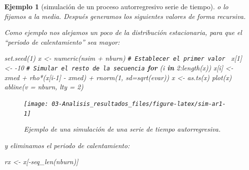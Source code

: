 \documentclass[
]{book}
\newenvironment{Shaded}{\begin{snugshade}}{\end{snugshade}}
\newcommand{\AttributeTok}[1]{\textcolor[rgb]{0.77,0.63,0.00}{#1}}
\newcommand{\CommentTok}[1]{\textcolor[rgb]{0.56,0.35,0.01}{\textit{#1}}}
\newcommand{\ControlFlowTok}[1]{\textcolor[rgb]{0.13,0.29,0.53}{\textbf{#1}}}
\newcommand{\DecValTok}[1]{\textcolor[rgb]{0.00,0.00,0.81}{#1}}
\newcommand{\FunctionTok}[1]{\textcolor[rgb]{0.00,0.00,0.00}{#1}}
\newcommand{\NormalTok}[1]{#1}
\newcommand{\OtherTok}[1]{\textcolor[rgb]{0.56,0.35,0.01}{#1}}
\newcommand{\SpecialCharTok}[1]{\textcolor[rgb]{0.00,0.00,0.00}{#1}}
\theoremstyle{break}
\newtheorem{example}{Ejemplo}[chapter]
\theoremstyle{nonumberplain}
\renewcommand{\CommentTok}[1]{\textcolor[rgb]{0.41,0.41,0.41}{\texttt{#1}}}
\begin{document}
\begin{example}[simulación de un proceso autorregresivo serie de tiempo]
o lo fijamos a la media.
Después generamos los siguientes valores de forma recursiva.

Como ejemplo nos alejamos un poco de la distribución estacionaria, para que el ``periodo de calentamiento'' sea mayor:

\begin{Shaded}
\begin{Highlighting}[]
\FunctionTok{set.seed}\NormalTok{(}\DecValTok{1}\NormalTok{)}
\NormalTok{x }\OtherTok{\textless{}{-}} \FunctionTok{numeric}\NormalTok{(nsim }\SpecialCharTok{+}\NormalTok{ nburn)}
\CommentTok{\# Establecer el primer valor }
\NormalTok{x[}\DecValTok{1}\NormalTok{] }\OtherTok{\textless{}{-}} \SpecialCharTok{{-}}\DecValTok{10}
\CommentTok{\# Simular el resto de la secuencia}
\ControlFlowTok{for}\NormalTok{ (i }\ControlFlowTok{in} \DecValTok{2}\SpecialCharTok{:}\FunctionTok{length}\NormalTok{(x))}
\NormalTok{  x[i] }\OtherTok{\textless{}{-}}\NormalTok{ xmed }\SpecialCharTok{+}\NormalTok{ rho}\SpecialCharTok{*}\NormalTok{(x[i}\DecValTok{{-}1}\NormalTok{] }\SpecialCharTok{{-}}\NormalTok{ xmed) }\SpecialCharTok{+} \FunctionTok{rnorm}\NormalTok{(}\DecValTok{1}\NormalTok{, }\AttributeTok{sd=}\FunctionTok{sqrt}\NormalTok{(evar))}
\NormalTok{x }\OtherTok{\textless{}{-}} \FunctionTok{as.ts}\NormalTok{(x)}
\FunctionTok{plot}\NormalTok{(x)}
\FunctionTok{abline}\NormalTok{(}\AttributeTok{v =}\NormalTok{ nburn, }\AttributeTok{lty =} \DecValTok{2}\NormalTok{)}
\end{Highlighting}
\end{Shaded}

\begin{figure}[!htb]

{\centering \texttt{[image: 03-Analisis\_resultados\_files/figure-latex/sim-ar1-1]} 

}

\caption{Ejemplo de una simulación de una serie de tiempo autorregresiva.}\label{fig:sim-ar1}
\end{figure}

y eliminamos el periodo de calentamiento:

\begin{Shaded}
\begin{Highlighting}[]
\NormalTok{rx }\OtherTok{\textless{}{-}}\NormalTok{ x[}\SpecialCharTok{{-}}\FunctionTok{seq\_len}\NormalTok{(nburn)]}
\end{Highlighting}
\end{Shaded}

\end{example}
\end{document}

